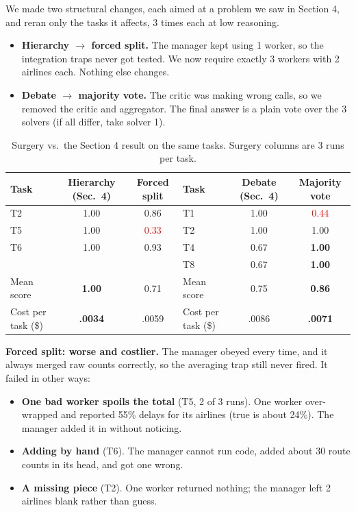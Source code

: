 \documentclass[10pt]{article}
\newcommand{\good}[1]{\textbf{#1}}
\newcommand{\bad}[1]{\textcolor{red}{#1}}
\begin{document}
We made two structural changes, each aimed at a problem we saw in Section 4, and reran only the tasks it affects,
3 times each at low reasoning.
\begin{itemize}
\item \textbf{Hierarchy $\rightarrow$ forced split.} The manager kept using 1 worker, so the integration traps never
  got tested. We now require exactly 3 workers with 2 airlines each. Nothing else changes.
\item \textbf{Debate $\rightarrow$ majority vote.} The critic was making wrong calls, so we removed the critic and
  aggregator. The final answer is a plain vote over the 3 solvers (if all differ, take solver 1).
\end{itemize}

\begin{table}[H]
\centering\small
\begin{tabular}{l cc | l cc}
\toprule
Task & Hierarchy (Sec.\ 4) & Forced split & Task & Debate (Sec.\ 4) & Majority vote \\
\midrule
T2 & 1.00 & 0.86 & T1 & 1.00 & \bad{0.44} \\
T5 & 1.00 & \bad{0.33} & T2 & 1.00 & 1.00 \\
T6 & 1.00 & 0.93 & T4 & 0.67 & \good{1.00} \\
   &      &      & T8 & 0.67 & \good{1.00} \\
\midrule
Mean score & \good{1.00} & 0.71 & Mean score & 0.75 & \good{0.86} \\
Cost per task (\$) & \good{.0034} & .0059 & Cost per task (\$) & .0086 & \good{.0071} \\
\bottomrule
\end{tabular}
\caption{Surgery vs.\ the Section 4 result on the same tasks. Surgery columns are 3 runs per task.}
\end{table}

\textbf{Forced split: worse and costlier.} The manager obeyed every time, and it always merged raw counts
correctly, so the averaging trap still never fired. It failed in other ways:
\begin{itemize}
\item \textbf{One bad worker spoils the total} (T5, 2 of 3 runs). One worker over-wrapped and reported 55\% delays
  for its airlines (true is about 24\%). The manager added it in without noticing.
\item \textbf{Adding by hand} (T6). The manager cannot run code, added about 30 route counts in its head, and got one wrong.
\item \textbf{A missing piece} (T2). One worker returned nothing; the manager left 2 airlines blank rather than guess.
\end{itemize}
\end{document}
